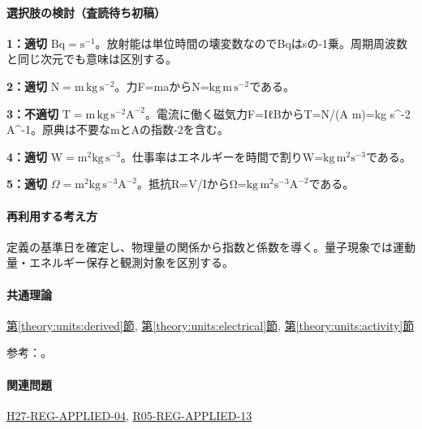 \paragraph{選択肢の検討（査読待ち初稿）}\mbox{}\par

\noindent\textbf{1：適切} \(\mathrm{Bq=s^{-1}}\)。放射能は単位時間の壊変数なのでBqはsの-1乗。周期周波数と同じ次元でも意味は区別する。\par

\noindent\textbf{2：適切} \(\mathrm{N=m\,kg\,s^{-2}}\)。力F=\allowbreak{}maからN=\(\mathrm{kg\,m\,s^{-2}}\)である。\par

\noindent\textbf{3：不適切} \(\mathrm{T=m\,kg\,s^{-2}A^{-2}}\)。電流に働く磁気力F=\allowbreak{}IℓBからT=\allowbreak{}N/(A m)=\allowbreak{}kg s\textasciicircum{}-2 A\textasciicircum{}-1。原典は不要なmとAの指数-2を含む。\par

\noindent\textbf{4：適切} \(\mathrm{W=m^2kg\,s^{-3}}\)。仕事率はエネルギーを時間で割りW=\(\mathrm{kg\,m^2s^{-3}}\)である。\par

\noindent\textbf{5：適切} \(\Omega=\mathrm{m^2kg\,s^{-3}A^{-2}}\)。抵抗R=\allowbreak{}V/IからΩ=\(\mathrm{kg\,m^2s^{-3}A^{-2}}\)である。\par

\paragraph{再利用する考え方} 定義の基準日を確定し、物理量の関係から指数と係数を導く。量子現象では運動量・エネルギー保存と観測対象を区別する。

\paragraph{共通理論} \hyperref[theory:units:derived]{第\ref*{theory:units:derived}節}, \hyperref[theory:units:electrical]{第\ref*{theory:units:electrical}節}, \hyperref[theory:units:activity]{第\ref*{theory:units:activity}節}

\par 参考：\cite{si_nist811,si_brochure9}。

\paragraph{関連問題} \hyperref[q:h27-reg-applied-04]{H27-REG-APPLIED-04}, \hyperref[q:r05-reg-applied-13]{R05-REG-APPLIED-13}

